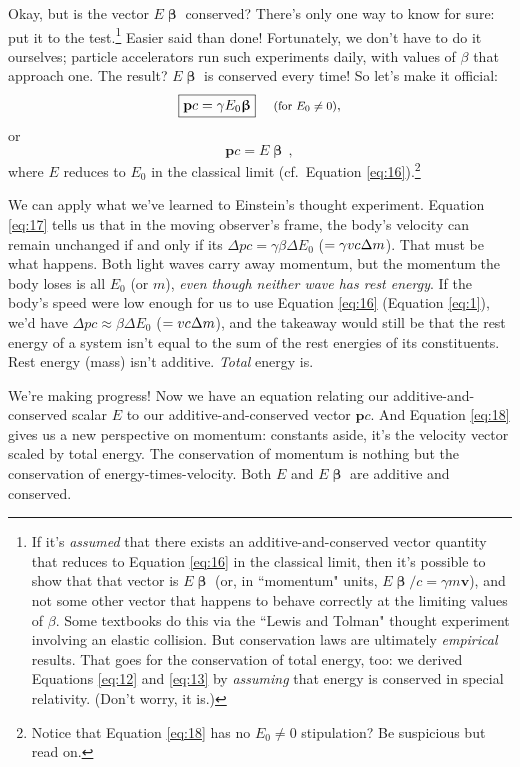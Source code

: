 \documentclass[12pt]{article}
\renewcommand{\vv}[1]{\mathbf{#1}}
\newcommand{\vvbeta}{\bm{\upbeta}}
\begin{document}
Okay, but is the vector $E \vvbeta$ conserved? There's only one way to know for sure: put it to the test.\footnote{If it's \emph{assumed} that there exists an additive-and-conserved vector quantity that reduces to Equation \ref{eq:16} in the classical limit, then it's possible to show that that vector is $E \vvbeta$ (or, in ``momentum" units, $E \vvbeta/c = \gamma m \vv v$), and not some other vector that happens to behave correctly at the limiting values of $\beta$. Some textbooks do this via the ``Lewis and Tolman" thought experiment involving an elastic collision. But conservation laws are ultimately \emph{empirical} results. That goes for the conservation of total energy, too: we derived Equations \ref{eq:12} and \ref{eq:13} by \emph{assuming} that energy is conserved in special relativity. (Don't worry, it is.)} Easier said than done! Fortunately, we don't have to do it ourselves; particle accelerators run such experiments daily, with values of $\beta$ that approach one. The result? $E \vvbeta$ is conserved every time! So let's make it official:
\begin{equation}\label{eq:17}
\boxed{\vv p c = \gamma E_0 \vvbeta}  \quad \textrm{\footnotesize{ (for $E_0 \neq 0$)}},
\end{equation}
or
\begin{equation}\label{eq:18}
\boxed{\vv p c = E \vvbeta} \, ,
\end{equation}
where $E$ reduces to $E_0$ in the classical limit (cf.\ Equation \ref{eq:16}).\footnote{Notice that Equation \ref{eq:18} has no $E_0 \neq 0$ stipulation? Be suspicious but read on.}

We can apply what we've learned to Einstein's thought experiment. Equation \ref{eq:17} tells us that in the moving observer's frame, the body's velocity can remain unchanged if and only if its $\Delta p c = \gamma \beta \Delta E_0$ ($= \gamma v c \mkern.5mu \Delta m$). That must be what happens. Both light waves carry away momentum, but the momentum the body loses is all $E_0$ (or $m$), \emph{even though neither wave has rest energy}. If the body's speed were low enough for us to use Equation \ref{eq:16} (Equation \ref{eq:1}), we'd have $\Delta p c \approx \beta \Delta E_0$ ($ = v c \mkern.5mu \Delta m$), and the takeaway would still be that the rest energy of a system isn't equal to the sum of the rest energies of its constituents. Rest energy (mass) isn't additive. \emph{Total} energy is.

We're making progress! Now we have an equation relating our additive-and-conserved scalar $E$ to our additive-and-conserved vector $\vv p c$. And Equation \ref{eq:18} gives us a new perspective on momentum: constants aside, it's the velocity vector scaled by total energy. The conservation of momentum is nothing but the conservation of energy-times-velocity. Both $E$ and $E \vvbeta$ are additive and conserved.
\end{document}
